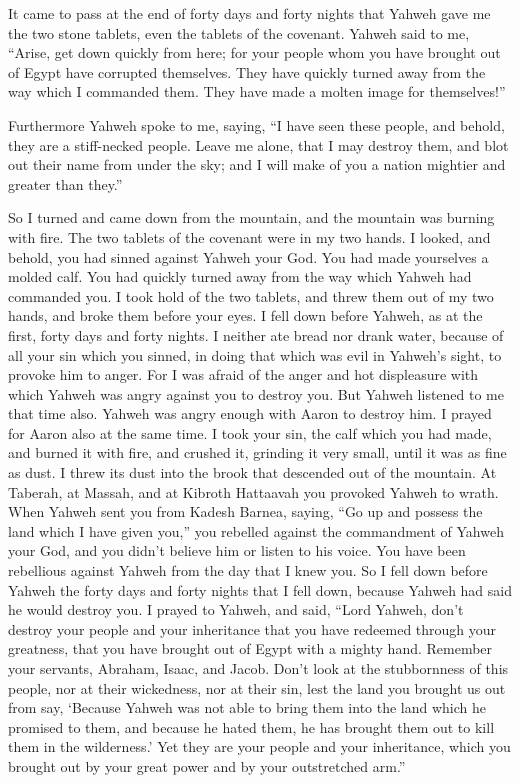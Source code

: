  It came to pass at the end of forty days and forty
nights that Yahweh gave me the two stone tablets, even the tablets of
the covenant.  Yahweh said to me, ``Arise, get down
quickly from here; for your people whom you have brought out of Egypt
have corrupted themselves. They have quickly turned away from the way
which I commanded them. They have made a molten image for themselves!''

 Furthermore Yahweh spoke to me, saying, ``I have seen
these people, and behold, they are a stiff-necked people.
 Leave me alone, that I may destroy them, and blot out
their name from under the sky; and I will make of you a nation mightier
and greater than they.''

 So I turned and came down from the mountain, and the
mountain was burning with fire. The two tablets of the covenant were in
my two hands.  I looked, and behold, you had sinned
against Yahweh your God. You had made yourselves a molded calf. You had
quickly turned away from the way which Yahweh had commanded you.
 I took hold of the two tablets, and threw them out of my
two hands, and broke them before your eyes.  I fell down
before Yahweh, as at the first, forty days and forty nights. I neither
ate bread nor drank water, because of all your sin which you sinned, in
doing that which was evil in Yahweh's sight, to provoke him to anger.
 For I was afraid of the anger and hot displeasure with
which Yahweh was angry against you to destroy you. But Yahweh listened
to me that time also.  Yahweh was angry enough with Aaron
to destroy him. I prayed for Aaron also at the same time.
 I took your sin, the calf which you had made, and burned
it with fire, and crushed it, grinding it very small, until it was as
fine as dust. I threw its dust into the brook that descended out of the
mountain.  At Taberah, at Massah, and at Kibroth
Hattaavah you provoked Yahweh to wrath.  When Yahweh sent
you from Kadesh Barnea, saying, ``Go up and possess the land which I
have given you,'' you rebelled against the commandment of Yahweh your
God, and you didn't believe him or listen to his voice. 
You have been rebellious against Yahweh from the day that I knew you.
 So I fell down before Yahweh the forty days and forty
nights that I fell down, because Yahweh had said he would destroy you.
 I prayed to Yahweh, and said, ``Lord Yahweh, don't
destroy your people and your inheritance that you have redeemed through
your greatness, that you have brought out of Egypt with a mighty hand.
 Remember your servants, Abraham, Isaac, and Jacob. Don't
look at the stubbornness of this people, nor at their wickedness, nor at
their sin,  lest the land you brought us out from say,
`Because Yahweh was not able to bring them into the land which he
promised to them, and because he hated them, he has brought them out to
kill them in the wilderness.'  Yet they are your people
and your inheritance, which you brought out by your great power and by
your outstretched arm.''


